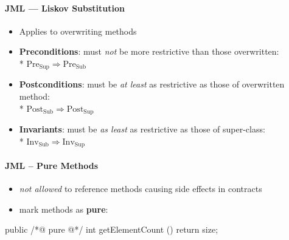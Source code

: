 \paragraph{JML --- Liskov Substitution}
\begin{itemize}
  \item Applies to overwriting methods
  \item \textbf{Preconditions}: must \emph{not} be more restrictive than those overwritten: \\* \( \text{Pre}_\text{Sup} \Rightarrow \text{Pre}_\text{Sub} \)
  \item \textbf{Postconditions}: must be \emph{at least} as restrictive as those of overwritten method: \\* \( \text{Post}_\text{Sub} \Rightarrow \text{Post}_\text{Sup} \)
  \item \textbf{Invariants}: must be \emph{as least} as restrictive as those of super-class: \\* \( \text{Inv}_\text{Sub} \Rightarrow \text{Inv}_\text{Sup} \)
\end{itemize}

\paragraph{JML -- Pure Methods}
\begin{itemize}
  \item \emph{not allowed} to reference methods causing side effects in contracts
  \item mark methods as \textbf{pure}:
\end{itemize}
\begin{java}
  public /*@ pure @*/ int getElementCount () {
    return size;
  }
\end{java}